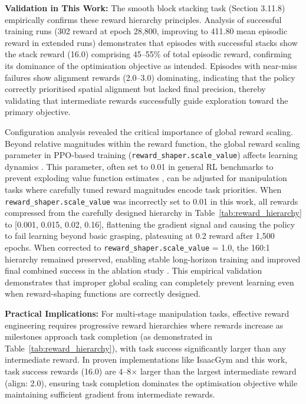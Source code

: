 \documentclass[12pt,a4paper,oneside]{report}
\begin{document}
\textbf{Validation in This Work:}
The smooth block stacking task (Section 3.11.8) empirically confirms these reward hierarchy principles. Analysis of successful training runs (302 reward at epoch 28,800, improving to 411.80 mean episodic reward in extended runs) demonstrates that episodes with successful stacks show the stack reward (16.0) comprising 45--55\% of total episodic reward, confirming its dominance of the optimisation objective as intended. Episodes with near-miss failures show alignment rewards (2.0--3.0) dominating, indicating that the policy correctly prioritised spatial alignment but lacked final precision, thereby validating that intermediate rewards successfully guide exploration toward the primary objective.

Configuration analysis revealed the critical importance of global reward scaling. Beyond relative magnitudes within the reward function, the global reward scaling parameter in PPO-based training (\texttt{reward\_shaper.scale\_value}) affects learning dynamics \cite{schulmanProximalPolicyOptimization2017}. This parameter, often set to 0.01 in general RL benchmarks to prevent exploding value function estimates \cite{yuApproximateValueIteration2017}, can be adjusted for manipulation tasks where carefully tuned reward magnitudes encode task priorities. When \texttt{reward\_shaper.scale\_value} was incorrectly set to 0.01 in this work, all rewards compressed from the carefully designed hierarchy in Table~\ref{tab:reward_hierarchy} to [0.001, 0.015, 0.02, 0.16], flattening the gradient signal and causing the policy to fail learning beyond basic grasping, plateauing at 0.2 reward after 1,500 epochs. When corrected to \texttt{reward\_shaper.scale\_value} = 1.0, the 160:1 hierarchy remained preserved, enabling stable long-horizon training and improved final combined success in the ablation study \cite{makoviychukIsaacGymHigh2021b}. This empirical validation demonstrates that improper global scaling can completely prevent learning even when reward-shaping functions are correctly designed.

\textbf{Practical Implications:}
For multi-stage manipulation tasks, effective reward engineering requires progressive reward hierarchies where rewards increase as milestones approach task completion (as demonstrated in Table~\ref{tab:reward_hierarchy}), with task success significantly larger than any intermediate reward. In proven implementations like IsaacGym \cite{makoviychukIsaacGymHigh2021b} and this work, task success rewards (16.0) are 4--8$\times$ larger than the largest intermediate reward (align: 2.0), ensuring task completion dominates the optimisation objective while maintaining sufficient gradient from intermediate rewards.
\end{document}
